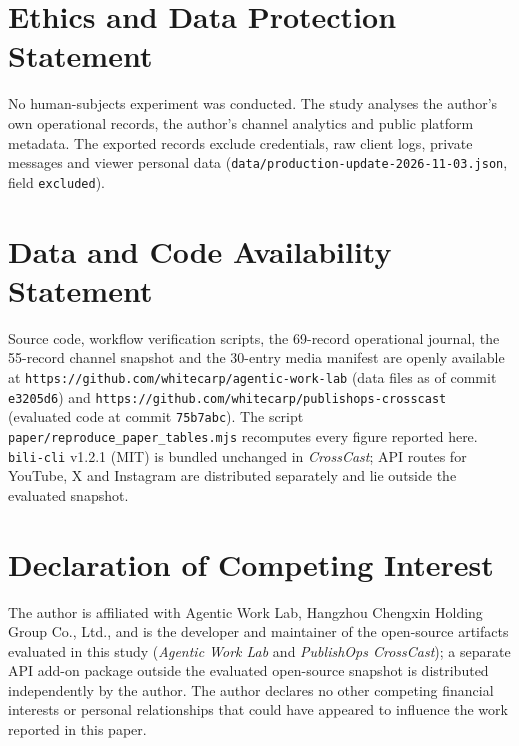 \documentclass[11pt,a4paper]{article}
\theoremstyle{definition}
\begin{document}
\section*{Ethics and Data Protection Statement}

No human-subjects experiment was conducted. The study analyses the author's own operational records, the author's channel analytics and public platform metadata. The exported records exclude credentials, raw client logs, private messages and viewer personal data (\texttt{data/\allowbreak{}production-\allowbreak{}update-\allowbreak{}2026\allowbreak{}-\allowbreak{}11-\allowbreak{}03.\allowbreak{}json}, field \texttt{excluded}).

\section*{Data and Code Availability Statement}

Source code, workflow verification scripts, the 69-record operational journal, the 55-record channel snapshot and the 30-entry media manifest are openly available at \texttt{https:/\allowbreak{}/\allowbreak{}github.\allowbreak{}com/\allowbreak{}whitecarp/\allowbreak{}agentic-\allowbreak{}work-\allowbreak{}lab} (data files as of commit \texttt{e3205d6}) and \texttt{https:/\allowbreak{}/\allowbreak{}github.\allowbreak{}com/\allowbreak{}whitecarp/\allowbreak{}publishops-\allowbreak{}crosscast} (evaluated code at commit \texttt{75b7abc}). The script \texttt{paper/\allowbreak{}reproduce\_\allowbreak{}paper\_\allowbreak{}tables.\allowbreak{}mjs} recomputes every figure reported here. \texttt{bili-cli} v1.2.1 (MIT) is bundled unchanged in \emph{CrossCast}; API routes for YouTube, X and Instagram are distributed separately and lie outside the evaluated snapshot.

\section*{Declaration of Competing Interest}

The author is affiliated with Agentic Work Lab, Hangzhou Chengxin Holding Group Co., Ltd., and is the developer and maintainer of the open-source artifacts evaluated in this study (\emph{Agentic Work Lab} and \emph{PublishOps CrossCast}); a separate API add-on package outside the evaluated open-source snapshot is distributed independently by the author. The author declares no other competing financial interests or personal relationships that could have appeared to influence the work reported in this paper.



\end{document}
